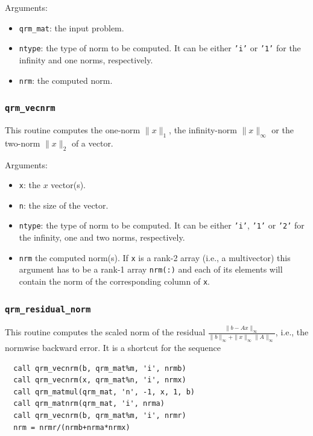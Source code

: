 \documentclass[11pt]{article}
\begin{document}

\noindent Arguments:
\begin{itemize}
\item \texttt{qrm\_mat}: the input problem.
\item \texttt{ntype}: the type of norm to be computed. It can be
  either \texttt{'i'} or \texttt{'1'} for the infinity and one norms,
  respectively.
\item \texttt{nrm}: the computed norm.
\end{itemize}


\subsubsection{\texttt{qrm\_vecnrm}}
This routine computes the one-norm $\|x\|_1$, the infinity-norm
$\|x\|_\infty$ or the two-norm $\|x\|_2$ of a vector.


\noindent Arguments:
\begin{itemize}
\item \texttt{x}: the $x$ vector(s).
\item \texttt{n}: the size of the vector.
\item \texttt{ntype}: the type of norm to be computed. It can be
  either \texttt{'i'}, \texttt{'1'} or \texttt{'2'} for the infinity,
  one and two norms, respectively.
\item \texttt{nrm} the computed norm(s). If \texttt{x} is a rank-2 array
  (i.e., a multivector) this argument has to be a rank-1 array
  \texttt{nrm(:)} and each of its elements will contain the norm of
  the corresponding column of \texttt{x}.
\end{itemize}

\subsubsection{\texttt{qrm\_residual\_norm}}
This routine computes the scaled norm of the residual
$\frac{\|b-Ax\|_\infty}{\|b\|_\infty + \|x\|_\infty\|A\|_\infty}$,
i.e., the normwise backward error. It is a shortcut for the sequence

\begin{lstlisting}
  call qrm_vecnrm(b, qrm_mat%m, 'i', nrmb)
  call qrm_vecnrm(x, qrm_mat%n, 'i', nrmx)
  call qrm_matmul(qrm_mat, 'n', -1, x, 1, b)
  call qrm_matnrm(qrm_mat, 'i', nrma)
  call qrm_vecnrm(b, qrm_mat%m, 'i', nrmr)
  nrm = nrmr/(nrmb+nrma*nrmx)
\end{lstlisting}
\end{document}
